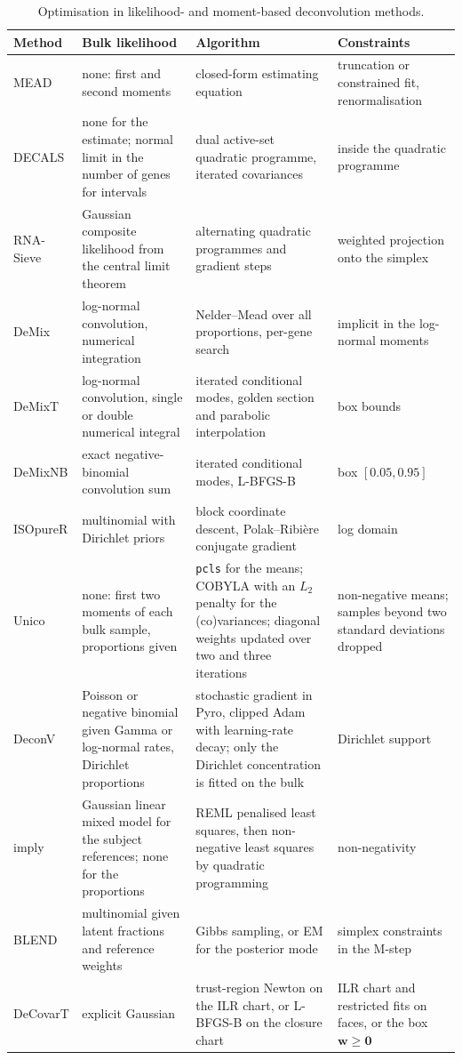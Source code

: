 \begin{table}[ht]
  \centering
  \small
  \caption{Optimisation in likelihood- and moment-based deconvolution methods.}
  \label{tab:review-optim}
  \begin{tabularx}{\textwidth}{@{}lYYY@{}}
    \toprule
    Method & Bulk likelihood & Algorithm & Constraints \\
    \midrule
    MEAD & none: first and second moments & closed-form estimating equation & truncation or constrained fit, renormalisation \\
    DECALS & none for the estimate; normal limit in the number of genes for intervals & dual active-set quadratic programme, iterated covariances & inside the quadratic programme \\
    RNA-Sieve & Gaussian composite likelihood from the central limit theorem & alternating quadratic programmes and gradient steps & weighted projection onto the simplex \\
    DeMix & log-normal convolution, numerical integration & Nelder--Mead over all proportions, per-gene search & implicit in the log-normal moments \\
    DeMixT & log-normal convolution, single or double numerical integral & iterated conditional modes, golden section and parabolic interpolation & box bounds \\
    DeMixNB & exact negative-binomial convolution sum & iterated conditional modes, L-BFGS-B & box \([0.05,0.95]\) \\
    ISOpureR & multinomial with Dirichlet priors & block coordinate descent, Polak--Ribi\`ere conjugate gradient & log domain \\
    Unico & none: first two moments of each bulk sample, proportions given & \texttt{pcls} for the means; COBYLA with an \(L_{2}\) penalty for the (co)variances; diagonal weights updated over two and three iterations & non-negative means; samples beyond two standard deviations dropped \\
    DeconV & Poisson or negative binomial given Gamma or log-normal rates, Dirichlet proportions & stochastic gradient in Pyro, clipped Adam with learning-rate decay; only the Dirichlet concentration is fitted on the bulk & Dirichlet support \\
    imply & Gaussian linear mixed model for the subject references; none for the proportions & REML penalised least squares, then non-negative least squares by quadratic programming & non-negativity \\
    BLEND & multinomial given latent fractions and reference weights & Gibbs sampling, or EM for the posterior mode & simplex constraints in the M-step \\
    DeCovarT & explicit Gaussian & trust-region Newton on the ILR chart, or L-BFGS-B on the closure chart & ILR chart and
      restricted fits on faces, or the box \(\boldsymbol{w}\ge\mathbf{0}\) \\
    \bottomrule
  \end{tabularx}
\end{table}

